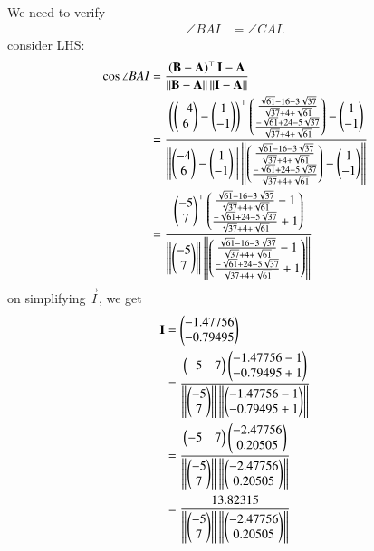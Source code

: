 \documentclass[journal,12pt,twocolumn]{IEEEtran}
\theoremstyle{remark}
\begin{document}
We need to verify \begin{align}\angle BAI &= \angle CAI.\end{align}
consider LHS:
\begin{align} 
\cos{\angle BAI} &= \frac{\left(\mathbf{B} - \mathbf{A}\right)^{\top}\mathbf{I} - \mathbf{A}}{\left\lVert\mathbf{B} - \mathbf{A}\right\rVert \left\lVert \mathbf{I} - \mathbf{A}\right\rVert}\\
 &= \frac{\left(\begin{pmatrix}-4\\6\end{pmatrix} - \begin{pmatrix}1\\-1\end{pmatrix}\right)^{\top}\begin{pmatrix}\frac{{\sqrt{61}-16-3\sqrt{37}}}{\sqrt{37}+4+\sqrt{61}}\\\frac{{-\sqrt{61}+24-5\sqrt{37}}}{\sqrt{37}+4+\sqrt{61}}\end{pmatrix} - \begin{pmatrix}1\\-1\end{pmatrix}}{\left\lVert\begin{pmatrix}-4\\6\end{pmatrix} - \begin{pmatrix}1\\-1\end{pmatrix}\right\rVert \left\lVert \begin{pmatrix}\frac{{\sqrt{61}-16-3\sqrt{37}}}{\sqrt{37}+4+\sqrt{61}}\\\frac{{-\sqrt{61}+24-5\sqrt{37}}}{\sqrt{37}+4+\sqrt{61}}\end{pmatrix} - \begin{pmatrix}1\\-1\end{pmatrix}\right\rVert}\\
 &= \frac{\begin{pmatrix}-5\\7\end{pmatrix}^{\top}\begin{pmatrix}\frac{{\sqrt{61}-16-3\sqrt{37}}}{\sqrt{37}+4+\sqrt{61}}-1\\\frac{{-\sqrt{61}+24-5\sqrt{37}}}{\sqrt{37}+4+\sqrt{61}}+1\end{pmatrix}}{\left\lVert\begin{pmatrix}-5\\7\end{pmatrix}\right\rVert \left\lVert \begin{pmatrix}\frac{{\sqrt{61}-16-3\sqrt{37}}}{\sqrt{37}+4+\sqrt{61}}-1\\\frac{{-\sqrt{61}+24-5\sqrt{37}}}{\sqrt{37}+4+\sqrt{61}}+1\end{pmatrix}\right\rVert}
\end{align}
on simplifying $\vec{I}$, we get
\begin{align}
\mathbf{I} &= \begin{pmatrix}-1.47756\\-0.79495\end{pmatrix}\\
&= \frac{\begin{pmatrix}-5&7\end{pmatrix}\begin{pmatrix}-1.47756-1\\-0.79495+1\end{pmatrix}}{\left\lVert\begin{pmatrix}-5\\7\end{pmatrix}\right\rVert \left\lVert \begin{pmatrix}-1.47756-1\\-0.79495+1\end{pmatrix}\right\rVert}\\
&= \frac{\begin{pmatrix}-5&7\end{pmatrix}\begin{pmatrix}-2.47756\\0.20505\end{pmatrix}}{\left\lVert\begin{pmatrix}-5\\7\end{pmatrix}\right\rVert \left\lVert \begin{pmatrix}-2.47756\\0.20505\end{pmatrix}\right\rVert}\\
&= \frac{13.82315}{\left\lVert\begin{pmatrix}-5\\7\end{pmatrix}\right\rVert \left\lVert\begin{pmatrix}-2.47756\\0.20505\end{pmatrix}\right\rVert}
\end{align}
\end{document}
